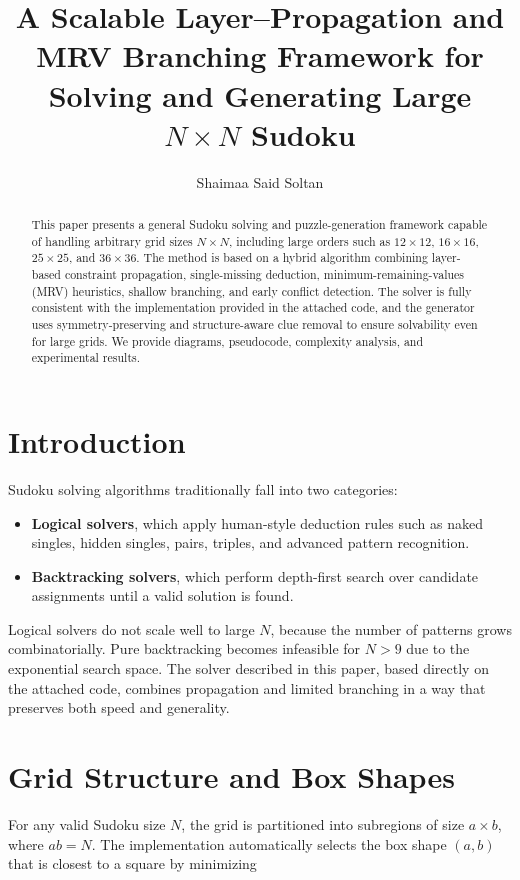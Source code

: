 \documentclass[11pt]{article}
\title{A Scalable Layer--Propagation and MRV Branching Framework for Solving and Generating Large $N \times N$ Sudoku}
\author{Shaimaa Said Soltan}
\date{}
\begin{document}
\maketitle

\begin{abstract}
This paper presents a general Sudoku solving and puzzle-generation framework
capable of handling arbitrary grid sizes $N \times N$, including large orders such as
$12 \times 12$, $16 \times 16$, $25 \times 25$, and $36 \times 36$.
The method is based on a hybrid algorithm combining layer-based constraint propagation,
single-missing deduction, minimum-remaining-values (MRV) heuristics, shallow branching,
and early conflict detection. 
The solver is fully consistent with the implementation provided in the attached code,
and the generator uses symmetry-preserving and structure-aware clue removal to ensure
solvability even for large grids.
We provide diagrams, pseudocode, complexity analysis, and experimental results.
\end{abstract}

\section{Introduction}
Sudoku solving algorithms traditionally fall into two categories:
\begin{itemize}
    \item \textbf{Logical solvers}, which apply human-style deduction rules such as
    naked singles, hidden singles, pairs, triples, and advanced pattern recognition.
    \item \textbf{Backtracking solvers}, which perform depth-first search over candidate
    assignments until a valid solution is found.
\end{itemize}

Logical solvers do not scale well to large $N$, because the number of patterns grows
combinatorially. Pure backtracking becomes infeasible for $N > 9$ due to the exponential
search space. The solver described in this paper, based directly on the attached code,
combines propagation and limited branching in a way that preserves both speed and
generality.

\section{Grid Structure and Box Shapes}
For any valid Sudoku size $N$, the grid is partitioned into subregions of size
$a \times b$, where $ab = N$. The implementation automatically selects the box shape
$(a,b)$ that is closest to a square by minimizing
\end{document}
